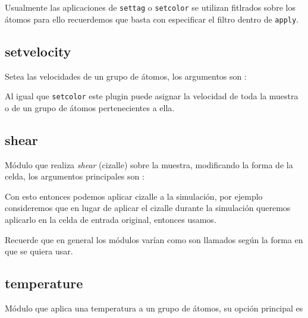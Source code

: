 Usualmente las aplicaciones de \verb|settag| o \verb|setcolor| se utilizan fitlrados sobre los \'atomos para ello recuerdemos que basta con especificar el filtro dentro de \verb|apply|.

\subsection{setvelocity}
Setea las velocidades de un grupo de \'atomos, los argumentos son :


Al igual que \verb|setcolor| este plugin puede asignar la velocidad de toda la muestra o de un grupo de \'atomos pertenecientes a ella.

\subsection{shear}
M\'odulo que realiza \textit{shear} (cizalle) sobre la muestra, modificando la forma de la celda, los argumentos principales son :


Con esto entonces podemos aplicar cizalle a la simulaci\'on, por ejemplo consideremos que en lugar de aplicar el cizalle durante la simulaci\'on queremos aplicarlo en la celda de entrada original, entonces usamos.


Recuerde que en general los m\'odulos var\'ian como son llamados seg\'un la forma en que se quiera usar.

\subsection{temperature}
M\'odulo que aplica una temperatura a un grupo de \'atomos, su opci\'on principal es



